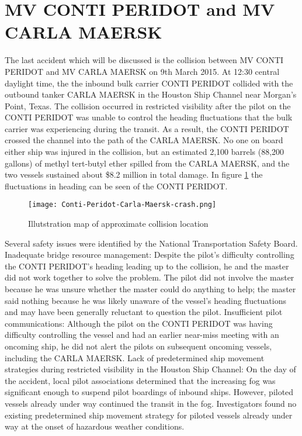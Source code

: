 \section{MV CONTI PERIDOT and MV CARLA MAERSK}
The last accident which will be discussed is the collision between MV CONTI PERIDOT and MV CARLA MAERSK on 9th March 2015. At 12:30 central daylight time, the the inbound bulk carrier CONTI PERIDOT collided with the outbound tanker CARLA MAERSK in the Houston Ship Channel near Morgan’s Point, Texas. The collision occurred in restricted visibility after the pilot on the CONTI PERIDOT was unable to control the heading fluctuations that the bulk carrier was experiencing during the transit. As a result, the CONTI PERIDOT crossed the channel into the path of the CARLA MAERSK. No one on board either ship was injured in the collision, but an estimated 2,100 barrels (88,200 gallons) of methyl tert-butyl ether spilled from the CARLA MAERSK, and the two vessels sustained about \$8.2 million in total damage. In figure \ref{fig:Conti-Peridot-Carla-Maersk-crash} the fluctuations in heading can be seen of the CONTI PERIDOT. 

\begin{figure}[p]
	\centering
	\texttt{[image: Conti-Peridot-Carla-Maersk-crash.png]}
	\caption{Illutstration map of approximate collision location}
	\label{fig:Conti-Peridot-Carla-Maersk-crash}
\end{figure}

Several safety issues were identified by the National Transportation Safety Board. Inadequate bridge resource management: Despite the pilot’s difficulty controlling the CONTI PERIDOT’s heading leading up to the collision, he and the master did not work together to solve the problem. The pilot did not involve the master because he was unsure whether the master could do anything to help; the master said nothing because he was likely unaware of the vessel’s heading fluctuations and may have been generally reluctant to question the pilot.
Insufficient pilot communications: Although the pilot on the CONTI PERIDOT was having difficulty controlling the vessel and had an earlier near-miss meeting with an oncoming ship, he did not alert the pilots on subsequent oncoming vessels, including the CARLA MAERSK.
Lack of predetermined ship movement strategies during restricted visibility in the Houston Ship Channel: On the day of the accident, local pilot associations  determined that the increasing fog was significant enough to suspend pilot boardings of inbound ships. However, piloted vessels already under way continued the transit in the fog. Investigators found no existing predetermined ship movement strategy for piloted vessels already under way at the onset of hazardous weather conditions.

